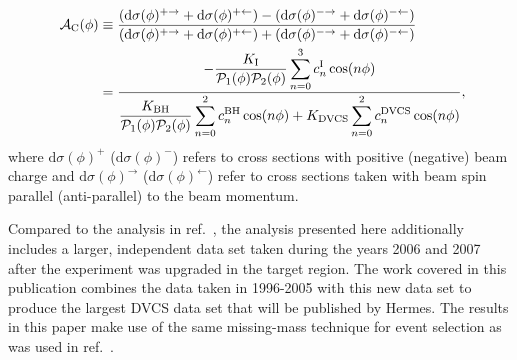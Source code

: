 \begin{align}
\hspace{0.5cm}\mathcal{A}_{\textrm{C}}(\phi) &\equiv  
\frac{(\textrm{d}\sigma(\phi)^{+\rightarrow} +
\textrm{d}\sigma(\phi)^{+\leftarrow}) -
(\textrm{d}\sigma(\phi)^{-\rightarrow}
+ \textrm{d}\sigma(\phi)^{-\leftarrow})}{(\textrm{d}\sigma(\phi)^{+\rightarrow}
+
\textrm{d}\sigma(\phi)^{+\leftarrow}) +
(\textrm{d}\sigma(\phi)^{-\rightarrow}
+ \textrm{d}\sigma(\phi)^{-\leftarrow})}&    \nonumber \\
&=\dfrac{{-\dfrac{K_{\textrm{I}}}{\mathcal{P}_{1}(\phi)\mathcal{P}_{2}(\phi)}
\displaystyle\sum_{n=0}^3
c_{n}^{\textrm{I}}\cos(n\phi)}}{\dfrac{K_{\textrm{BH}}}{\mathcal{P}_{1}
(\phi)\mathcal{P}_
{2}(\phi)}
\displaystyle\sum_{n=0}^2
c_{n}^{\textrm{BH}}\cos(n\phi) + 
K_{\textrm{DVCS}}\displaystyle\sum_{n=0}^2 c_{n}^{\textrm{DVCS}}\cos(n\phi)} ,&
\label{e:ac}
\end{align}
where $\textrm{d}\sigma(\phi)^+$ ($\textrm{d}\sigma(\phi)^-$) refers to
cross sections with positive (negative) beam charge and
$\textrm{d}\sigma(\phi)^\rightarrow$ ($\textrm{d}\sigma(\phi)^\leftarrow$) refer
to cross sections taken with beam spin parallel (anti-parallel) to the
beam momentum.

Compared to the analysis in ref.~\cite{Air09}, the analysis presented here additionally includes a larger,
independent data set taken during the years 2006 and 2007 after the
experiment was upgraded in the target region. The work covered
  in this publication combines the data taken in 1996-2005 with this
  new data set to produce the largest DVCS data set that will be published by H{\sc ermes}.
The results in this paper make use of the same missing-mass technique for event selection as was used in ref.~\cite{Air09}.
